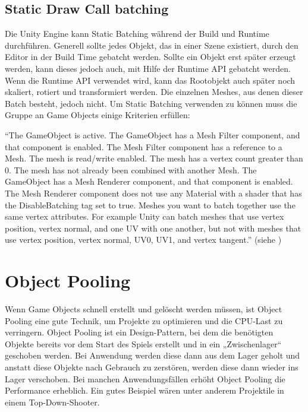 \subsection{Static Draw Call batching}
Die Unity Engine kann Static Batching während der Build und Runtime durchführen. Generell sollte jedes Objekt, das in einer Szene existiert, durch den Editor in der Build Time gebatcht werden. Sollte ein Objekt erst später erzeugt werden, kann dieses jedoch auch, mit Hilfe der Runtime API gebatcht werden. Wenn die Runtime API verwendet wird, kann das Rootobjekt auch später noch skaliert, rotiert und transformiert werden. Die einzelnen Meshes, aus denen dieser Batch besteht, jedoch nicht. Um Static Batching verwenden zu können muss die Gruppe an Game Objects einige Kriterien erfüllen:

"`The GameObject is active.
The GameObject has a Mesh Filter
component, and that component is enabled.
The Mesh Filter component has a reference to a Mesh.
The mesh is read/write enabled.
The mesh has a vertex count greater than 0.
The mesh has not already been combined with another Mesh.
The GameObject has a Mesh Renderer
component, and that component is enabled.
The Mesh Renderer component does not use any Material with a shader
that has the DisableBatching tag set to true.
Meshes you want to batch together use the same vertex attributes. For example Unity can batch meshes that use vertex position, vertex normal, and one UV with one another, but not with meshes that use vertex position, vertex normal, UV0, UV1, and vertex tangent."'
(siehe \cite{_drawcallbatching})


\section{Object Pooling}
Wenn Game Objects schnell erstellt und gelöscht werden müssen, ist Object Pooling eine gute Technik, um Projekte zu optimieren und die CPU-Last zu verringern. Object Pooling ist ein Design-Pattern, bei dem die benötigten Objekte bereits vor dem Start des Spiels erstellt und in ein „Zwischenlager“ geschoben werden. Bei Anwendung werden diese dann aus dem Lager geholt und anstatt diese Objekte nach Gebrauch zu zerstören, werden diese dann wieder ins Lager verschoben. Bei manchen Anwendungsfällen erhöht Object Pooling die Performance erheblich. Ein gutes Beispiel wären unter anderem Projektile in einem Top-Down-Shooter.
\cite{_objectpooling}


